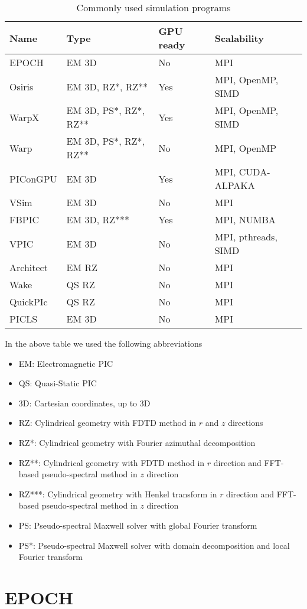 \documentclass[12pt, class=report, crop=false]{standalone}
\begin{document}
\begin{table}
  \begin{tabular}{l l l l}
  \toprule
  \textbf{Name} & \textbf{Type} & \textbf{GPU ready} & \textbf{Scalability}\\
  \midrule
  EPOCH & EM 3D & No & MPI\\
  Osiris & EM 3D, RZ*, RZ** & Yes & MPI, OpenMP, SIMD\\
  WarpX & EM 3D, PS*, RZ*, RZ** & Yes & MPI, OpenMP, SIMD\\
  Warp & EM 3D, PS*, RZ*, RZ** & No & MPI, OpenMP\\
  PIConGPU & EM 3D & Yes & MPI, CUDA-ALPAKA\\
  VSim & EM 3D & No & MPI\\
  FBPIC & EM 3D, RZ*** & Yes & MPI, NUMBA\\
  VPIC & EM 3D & No & MPI, pthreads, SIMD\\
  Architect & EM RZ & No & MPI\\
  Wake & QS RZ & No & MPI\\
  QuickPIc & QS RZ & No & MPI\\
  PICLS & EM 3D & No & MPI\\
  \bottomrule
  \end{tabular}
  \caption{Commonly used simulation programs}%
  \label{tab:pic-software}
\end{table}

In the above table we used the following abbreviations
\begin{itemize}
    \item EM: Electromagnetic PIC
    \item QS: Quasi-Static PIC
    \item 3D: Cartesian coordinates, up to 3D
    \item RZ: Cylindrical geometry with FDTD method in \(r\) and \(z\) directions
    \item RZ*: Cylindrical geometry with Fourier azimuthal decomposition
    \item RZ**: Cylindrical geometry with FDTD method in \(r\) direction
                and FFT-based pseudo-spectral method in \(z\) direction
    \item RZ***: Cylindrical geometry with Henkel transform in \(r\) direction
                and FFT-based pseudo-spectral method in \(z\) direction
    \item PS: Pseudo-spectral Maxwell solver with global Fourier transform
    \item PS*: Pseudo-spectral Maxwell solver with domain decomposition and local Fourier transform
\end{itemize}


\section{EPOCH}
\end{document}
